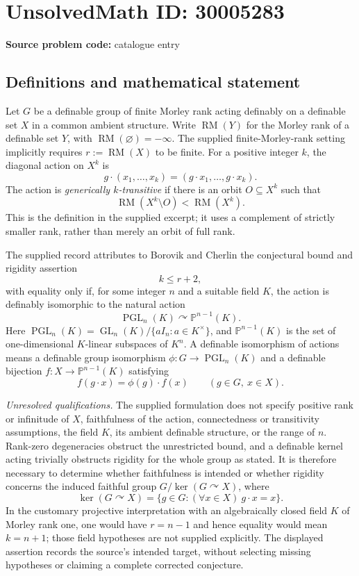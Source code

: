 \documentclass[11pt]{article}
\begin{document}
\section*{UnsolvedMath ID: 30005283}
\textbf{Source problem code:} catalogue entry
\subsection{Definitions and mathematical statement}
Let \(G\) be a definable group of finite Morley rank acting definably on a definable set \(X\) in a common ambient structure. Write \(\operatorname{RM}(Y)\) for the Morley rank of a definable set \(Y\), with \(\operatorname{RM}(\varnothing)=-\infty\). The supplied finite-Morley-rank setting implicitly requires \(r:=\operatorname{RM}(X)\) to be finite. For a positive integer \(k\), the diagonal action on \(X^k\) is
\[
 g\cdot(x_1,\ldots,x_k)=(g\cdot x_1,\ldots,g\cdot x_k).
\]
The action is \emph{generically \(k\)-transitive} if there is an orbit \(O\subseteq X^k\) such that
\[
 \operatorname{RM}(X^k\setminus O)<\operatorname{RM}(X^k).
\]
This is the definition in the supplied excerpt; it uses a complement of strictly smaller rank, rather than merely an orbit of full rank.

The supplied record attributes to Borovik and Cherlin the conjectural bound and rigidity assertion
\[
 k\leq r+2,
\]
with equality only if, for some integer \(n\) and a suitable field \(K\), the action is definably isomorphic to the natural action
\[
 \operatorname{PGL}_n(K)\curvearrowright\mathbb P^{n-1}(K).
\]
Here \(\operatorname{PGL}_n(K)=\operatorname{GL}_n(K)/\{aI_n:a\in K^\times\}\), and \(\mathbb P^{n-1}(K)\) is the set of one-dimensional \(K\)-linear subspaces of \(K^n\). A definable isomorphism of actions means a definable group isomorphism \(\phi:G\to\operatorname{PGL}_n(K)\) and a definable bijection \(f:X\to\mathbb P^{n-1}(K)\) satisfying
\[
 f(g\cdot x)=\phi(g)\cdot f(x)
 \qquad(g\in G,\ x\in X).
\]

\emph{Unresolved qualifications.} The supplied formulation does not specify positive rank or infinitude of \(X\), faithfulness of the action, connectedness or transitivity assumptions, the field \(K\), its ambient definable structure, or the range of \(n\). Rank-zero degeneracies obstruct the unrestricted bound, and a definable kernel acting trivially obstructs rigidity for the whole group as stated. It is therefore necessary to determine whether faithfulness is intended or whether rigidity concerns the induced faithful group \(G/\ker(G\curvearrowright X)\), where
\[
 \ker(G\curvearrowright X)=\{g\in G:(\forall x\in X)\ g\cdot x=x\}.
\]
In the customary projective interpretation with an algebraically closed field \(K\) of Morley rank one, one would have \(r=n-1\) and hence equality would mean \(k=n+1\); those field hypotheses are not supplied explicitly. The displayed assertion records the source's intended target, without selecting missing hypotheses or claiming a complete corrected conjecture.
\end{document}
